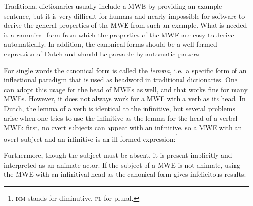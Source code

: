 \documentclass[output=paper,colorlinks,citecolor=brown]{langscibook}
\begin{document}
Traditional dictionaries usually include a MWE by providing an example sentence, but it is very difficult for humans and nearly impossible for software to derive the general properties of the MWE from such an example. What is needed is a canonical form from which the properties of the MWE are easy to  derive automatically. In addition, the canonical forms should be a well-formed expression of Dutch and should be parsable by automatic parsers.

For single words the canonical form is called the \textit{lemma}, i.e.\ a specific form of an inflectional paradigm that is used as headword in traditional dictionaries. One can adopt this usage for the head of MWEs as well, and that works fine for many MWEs. However, it does not always work for a MWE with a verb as its head.
In Dutch, the lemma of a verb is identical to the infinitive, but several problems arise when one tries to use the infinitive as the lemma for the head of a verbal MWE: first, no overt subjects can appear with an infinitive, so a MWE with an overt subject and an infinitive is an ill-formed expression:\footnote{\textsc{dim} stands for diminutive, \textsc{pl} for plural.}

\begin{exe}
\ex
\begin{xlist}
\end{xlist}

\end{exe}
Furthermore, though the subject must be absent, it is present implicitly and interpreted as an animate actor. If the subject of a MWE is not animate, using the MWE with an infinitival head as the canonical form gives infelicitous results:

\begin{exe}
\ex
\begin{xlist}
\end{xlist}
\end{exe}
\end{document}

